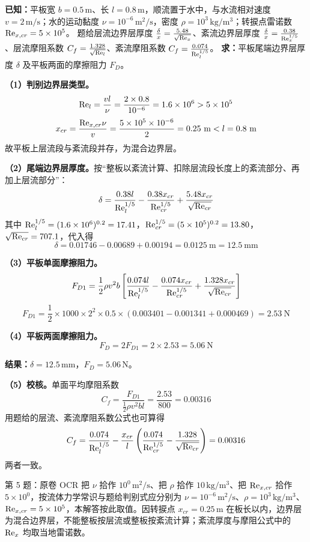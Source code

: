 \begin{jie}
\textbf{已知：}平板宽 $b=0.5\,\mathrm{m}$、长 $l=0.8\,\mathrm{m}$，顺流置于水中，与水流相对速度 $v=2\,\mathrm{m/s}$；水的运动黏度 $\nu=10^{-6}\,\mathrm{m^2/s}$，密度 $\rho=10^3\,\mathrm{kg/m^3}$；转捩点雷诺数 $\mathrm{Re}_{x,cr}=5\times10^5$。
题给层流边界层厚度 $\frac{\delta}{x}=\frac{5.48}{\sqrt{\mathrm{Re}_x}}$、紊流边界层厚度 $\frac{\delta}{x}=\frac{0.38}{\mathrm{Re}_x^{1/5}}$、层流摩阻系数 $C_f=\frac{1.328}{\sqrt{\mathrm{Re}_l}}$、紊流摩阻系数 $C_f=\frac{0.074}{\mathrm{Re}_l^{1/5}}$。
\textbf{求：}平板尾端边界层厚度 $\delta$ 及平板两面的摩擦阻力 $F_D$。

\textbf{（1）判别边界层类型。}
\[
\mathrm{Re}_l=\frac{vl}{\nu}=\frac{2\times0.8}{10^{-6}}=1.6\times10^6>5\times10^5
\]
\[
x_{cr}=\frac{\Rey_{x,cr}\nu}{v}=\frac{5\times10^5\times10^{-6}}{2}=0.25\ \mathrm{m}<l=0.8\ \mathrm{m}
\]
故平板上层流段与紊流段并存，为混合边界层。

\textbf{（2）尾端边界层厚度。}按“整板以紊流计算、扣除层流段长度上的紊流部分、再加上层流部分”：
\[
\delta=\frac{0.38l}{\mathrm{Re}_l^{1/5}}-\frac{0.38x_{cr}}{\mathrm{Re}_{cr}^{1/5}}+\frac{5.48x_{cr}}{\sqrt{\mathrm{Re}_{cr}}}
\]
其中 $\mathrm{Re}_l^{1/5}=(1.6\times10^6)^{0.2}=17.41$，$\mathrm{Re}_{cr}^{1/5}=(5\times10^5)^{0.2}=13.80$，$\sqrt{\mathrm{Re}_{cr}}=707.1$，代入得
\[
\delta=0.01746-0.00689+0.00194=0.0125\ \mathrm{m}=12.5\ \mathrm{mm}
\]

\textbf{（3）平板单面摩擦阻力。}
\[
F_{D1}=\frac{1}{2}\rho v^2b\left[\frac{0.074l}{\mathrm{Re}_l^{1/5}}-\frac{0.074x_{cr}}{\mathrm{Re}_{cr}^{1/5}}+\frac{1.328x_{cr}}{\sqrt{\mathrm{Re}_{cr}}}\right]
\]
\[
F_{D1}=\frac{1}{2}\times1000\times2^2\times0.5\times\left(0.003401-0.001341+0.000469\right)=2.53\ \mathrm{N}
\]

\textbf{（4）平板两面摩擦阻力。}
\[
F_D=2F_{D1}=2\times2.53=5.06\ \mathrm{N}
\]

\textbf{结果：}$\delta=12.5\,\mathrm{mm}$，$F_D=5.06\,\mathrm{N}$。

\textbf{（5）校核。}单面平均摩阻系数
\[
C_f=\frac{F_{D1}}{\frac{1}{2}\rho v^2bl}=\frac{2.53}{800}=0.00316
\]
用题给的层流、紊流摩阻系数公式也可算得
\[
C_f=\frac{0.074}{\mathrm{Re}_l^{1/5}}-\frac{x_{cr}}{l}\left(\frac{0.074}{\mathrm{Re}_{cr}^{1/5}}-\frac{1.328}{\sqrt{\mathrm{Re}_{cr}}}\right)=0.00316
\]
两者一致。
\end{jie}

\begin{tishi}
第 5 题：原卷 OCR 把 $\nu$ 拾作 $10^{0}\,\mathrm{m^2/s}$、把 $\rho$ 拾作 $10\,\mathrm{kg/m^3}$、把 $\mathrm{Re}_{x,cr}$ 拾作 $5\times10^{0}$，按流体力学常识与题给判别式应分别为 $\nu=10^{-6}\,\mathrm{m^2/s}$、$\rho=10^{3}\,\mathrm{kg/m^3}$、$\mathrm{Re}_{x,cr}=5\times10^{5}$，本解答按此取值。因转捩点 $x_{cr}=0.25\,\mathrm{m}$ 在板长以内，边界层为混合边界层，不能整板按层流或整板按紊流计算；紊流厚度与摩阻公式中的 $\mathrm{Re}_x$ 均取当地雷诺数。
\end{tishi}

